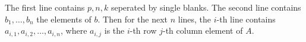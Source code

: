 The first line contains $p, n, k$ seperated by single blanks. The second line contains $b_1,\ldots,b_n$ the elements of $b$. Then for the next $n$ lines, the $i$-th line contains $a_{i,1},a_{i,2},\ldots,a_{i,n}$, where $a_{i,j}$ is the $i$-th row $j$-th column element of $A$.
